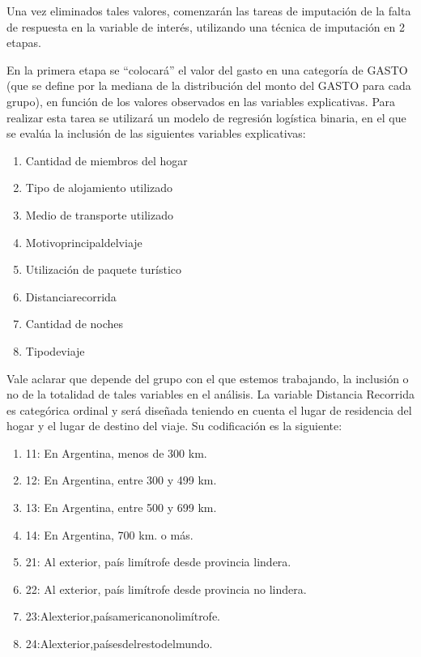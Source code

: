 \documentclass[
  openany]{book}
\begin{document}
Una vez eliminados tales valores, comenzarán las tareas de imputación de la falta de respuesta en la variable de interés, utilizando una técnica de imputación en 2 etapas.

En la primera etapa se ``colocará'' el valor del gasto en una categoría de GASTO (que se define por la mediana de la distribución del monto del GASTO para cada grupo), en función de los valores observados en las variables explicativas. Para realizar esta tarea se utilizará un modelo de regresión logística binaria, en el que se evalúa la inclusión de las siguientes variables explicativas:

\begin{enumerate}
\def\labelenumi{\arabic{enumi}.}
\item
  Cantidad de miembros del hogar
\item
  Tipo de alojamiento utilizado
\item
  Medio de transporte utilizado
\item
  Motivoprincipaldelviaje
\item
  Utilización de paquete turístico
\item
  Distanciarecorrida
\item
  Cantidad de noches
\item
  Tipodeviaje
\end{enumerate}

Vale aclarar que depende del grupo con el que estemos trabajando, la inclusión o no de la totalidad de tales variables en el análisis. La variable Distancia Recorrida es categórica ordinal y será diseñada teniendo en cuenta el lugar de residencia del hogar y el lugar de destino del viaje. Su codificación es la siguiente:

\begin{enumerate}
\def\labelenumi{\arabic{enumi}.}
\item
  11: En Argentina, menos de 300 km.
\item
  12: En Argentina, entre 300 y 499 km.
\item
  13: En Argentina, entre 500 y 699 km.
\item
  14: En Argentina, 700 km. o más.
\item
  21: Al exterior, país limítrofe desde provincia lindera.
\item
  22: Al exterior, país limítrofe desde provincia no lindera.
\item
  23:Alexterior,paísamericanonolimítrofe.
\item
  24:Alexterior,paísesdelrestodelmundo.
\end{enumerate}
\end{document}
